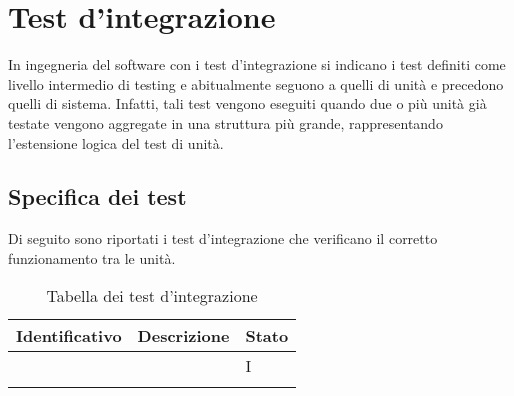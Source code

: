 \section{Test d'integrazione}\label{sec:test-d'integrazione}
In ingegneria del software con i test d'integrazione si indicano i test definiti come livello intermedio di testing e abitualmente seguono a quelli di unità e precedono quelli di sistema.
Infatti, tali test vengono eseguiti quando due o più unità già testate vengono aggregate in una struttura più grande, rappresentando l'estensione logica del test di unità.

\setcounter{rowcount}{0}
\subsection{Specifica dei test}\label{subsec:specifica-dei-test-integrazione}
Di seguito sono riportati i test d'integrazione che verificano il corretto funzionamento tra le unità.
\begin{center}
    \begin{longtable}{ |C{3cm} | C{8.5cm}| C{1.5cm} |} \hline
        \textbf{Identificativo} & \textbf{Descrizione} & \textbf{Stato}\\\hline

                     & & I              \\\hline
        \caption{Tabella dei test d'integrazione}
    \end{longtable}
\end{center}
\setcounter{rowcount}{0}

